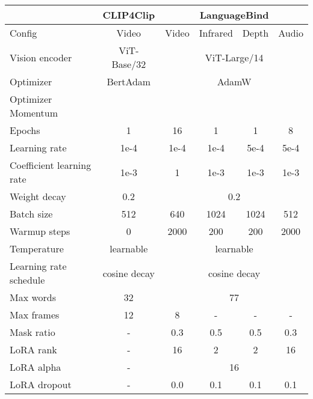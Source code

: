 \documentclass{article} \usepackage{iclr2024_conference,times}
\begin{document}
\begin{table}[htbp]
\setlength\tabcolsep{2mm}
    \small
    \label{tab:setting}
    \centering
        \begin{tabular}{l|c|cccc}
             & CLIP4Clip & \multicolumn{4}{c}{LanguageBind} \\
            \midrule
             \multirow{1}{*}{Config} & Video & Video & Infrared & Depth & Audio \\
            \midrule
            Vision encoder & ViT-Base/32 & \multicolumn{4}{c}{ViT-Large/14} \\
            Optimizer & BertAdam& \multicolumn{4}{c}{AdamW} \\
            Optimizer Momentum &  & \multicolumn{4}{c}{} \\
            Epochs & 1 & 16 & 1 & 1 & 8 \\
            Learning rate & 1e-4 & 1e-4 & 1e-4 & 5e-4 & 5e-4 \\
            Coefficient learning rate & 1e-3 & 1 & 1e-3 & 1e-3 & 1e-3 \\
            Weight decay & 0.2 & \multicolumn{4}{c}{0.2} \\
            Batch size & 512 & 640 & 1024 & 1024 & 512 \\
            Warmup steps & 0 & 2000 & 200 & 200 & 2000 \\
            Temperature & learnable & \multicolumn{4}{c}{learnable} \\
            Learning rate schedule & cosine decay & \multicolumn{4}{c}{cosine decay} \\
Max words & 32 & \multicolumn{4}{c}{77} \\
            Max frames & 12 & 8 & - & - & - \\
Mask ratio & - & 0.3 & 0.5 & 0.5 & 0.3 \\
            LoRA rank & - & 16 & 2 & 2 & 16 \\
            LoRA alpha & - & \multicolumn{4}{c}{16} \\
            LoRA dropout & - & 0.0 & 0.1 & 0.1 & 0.1 \\
        \end{tabular}
\end{table}
\end{document}

